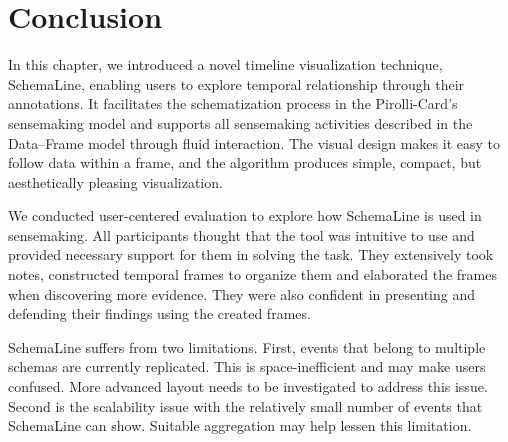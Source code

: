 \section{Conclusion}

In this chapter, we introduced a novel timeline visualization technique, SchemaLine, enabling users to explore temporal relationship through their annotations. It facilitates the schematization process in the Pirolli-Card's sensemaking model and supports all sensemaking activities described in the Data--Frame model through fluid interaction. The visual design makes it easy to follow data within a frame, and the algorithm produces simple, compact, but aesthetically pleasing visualization. 

We conducted user-centered evaluation to explore how SchemaLine is used in sensemaking. All participants thought that the tool was intuitive to use and provided necessary support for them in solving the task. They extensively took notes, constructed temporal frames to organize them and elaborated the frames when discovering more evidence. They were also confident in presenting and defending their findings using the created frames.

SchemaLine suffers from two limitations. First, events that belong to multiple schemas are currently replicated. This is space-inefficient and may make users confused. More advanced layout needs to be investigated to address this issue. Second is the scalability issue with the relatively small number of events that SchemaLine can show. Suitable aggregation may help lessen this limitation.